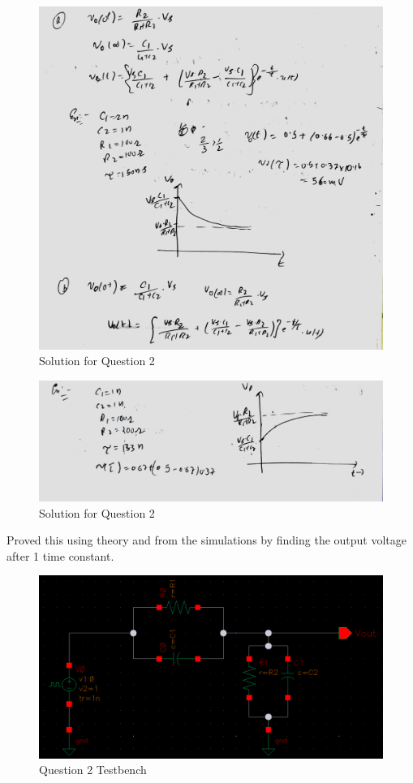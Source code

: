 \documentclass[a4paper]{article}
\begin{document}
\begin{figure}
    \centering
    \includegraphics[width=1\linewidth]{images/Lec_2_Q2_Soln_Part_2.jpeg}
    \caption{Solution for Question 2}
\end{figure}

\begin{figure}
    \centering
    \includegraphics[width=1\linewidth]{images/Lec_2_Q2_Soln_Part_3.jpeg}
    \caption{Solution for Question 2}
\end{figure}
Proved this using theory and from the simulations  by finding the output voltage after 1 time constant.

\begin{figure}
    \centering
    \includegraphics[width=1\linewidth]{images/Lec_2_Q_2_testbench.png}
    \caption{Question 2 Testbench}
\end{figure}
\end{document}
